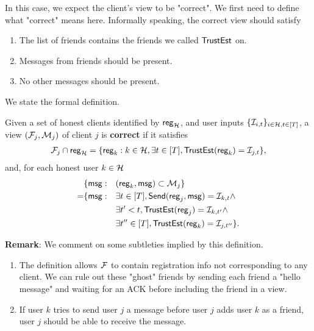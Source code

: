
In this case, we expect the client's view to be "correct". We first need to define what "correct" means here. Informally speaking, the correct view should satisfy
\begin{enumerate}
    \item The list of friends contains the friends we called $\mathsf{TrustEst}$ on.         
    \item Messages from friends should be present.  
    \item No other messages should be present. 
\end{enumerate}
We state the formal definition.
\begin{definition}
\label{defn:client-view-correct}
Given a set of honest clients identified by $\mathsf{reg}_{\mathcal{H}}$, and user inputs $\{\mathcal{I}_{i, t}\}_{i \in \mathcal{H}, t \in [T]}$, a view $(\mathcal{F}_j, \mathcal{M}_j)$ of client $j$ is \textbf{correct} if it satisfies
\begin{multline*}
\mathcal{F}_j \cap \mathsf{reg}_{\mathcal{H}} = \{\mathsf{reg}_k: k \in \mathcal{H}, \exists t \in [T], \mathsf{TrustEst}(\mathsf{reg}_k) = \mathcal{I}_{j, t}\},    
\end{multline*}
and, for each honest user $k \in \mathcal{H}$
\begin{align*}
     &\{\mathsf{msg}: &&(\mathsf{reg}_k, \mathsf{msg}) \subset \mathcal{M}_j\} \\
      =& \{\mathsf{msg}: &&\exists t \in [T], \mathsf{Send}(\mathsf{reg}_j, \mathsf{msg}) = \mathcal{I}_{k, t} \land \\
          &   &&\exists t' < t, \mathsf{TrustEst}(\mathsf{reg}_j) = \mathcal{I}_{k, t'} \land \\
          &   &&\exists t'' \in [T], \mathsf{TrustEst}(\mathsf{reg}_k) = \mathcal{I}_{j, t''}\}.
\end{align*}
\end{definition}
\textbf{Remark}: We comment on some subtleties implied by this definition.
\begin{enumerate}
    \item  The definition allows $\mathcal{F}$ to contain registration info not corresponding to any client. We can rule out these "ghost" friends by sending each friend a "hello message" and waiting for an ACK before including the friend in a view. 
\item If user $k$ tries to send user $j$ a message before user $j$ adds user $k$ as a friend, user $j$ should be able to receive the message.
\end{enumerate}

